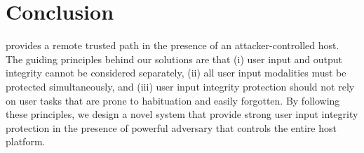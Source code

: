 \section{Conclusion}
\label{sec:conclusionProtection}

\name provides a remote trusted path in the presence of an attacker-controlled host. The guiding principles behind our solutions are that (i) user input and output integrity cannot be considered separately, (ii) all user input modalities must be protected simultaneously, and (iii) user input integrity protection should not rely on user tasks that are prone to habituation and easily forgotten. By following these principles, we design a novel system that provide strong user input integrity protection in the presence of powerful adversary that controls the entire host platform.